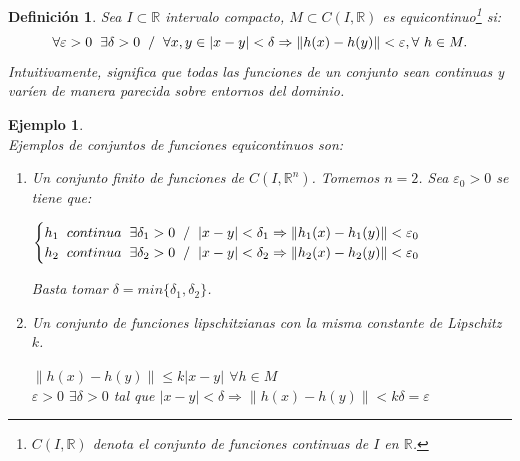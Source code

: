 \documentclass[11pt, a4paper,twoside]{article}
\newcommand{\iindex}[1]{\emph{#1}\index{#1}}
\theoremstyle{theorem-style}  %
\theoremstyle{definition-style}
\newtheorem{definition}{Definición}[section]
\theoremstyle{example-style}
\newtheorem{example}{Ejemplo}[section]
\providecommand{\norm}[1]{\left\lVert#1\right\rVert} %
\begin{document}
\begin{definition}
	Sea $I \subset \mathbb{R}$ intervalo compacto, $M \subset C(I, \mathbb{R})$ es \iindex{equicontinuo}\footnote{ $ C(I, \mathbb{R})$ denota el conjunto de funciones continuas de $ I $ en $ \mathbb{R} $.} si:
	\[\forall \varepsilon > 0 \hspace{0,2cm} \exists \delta > 0 \hspace{0,2cm} / \hspace{0,2cm} \forall x, y\in |x-y| < \delta \Rightarrow \norm{h(x) - h(y)} < \varepsilon, \forall \ h \in M.\]
	Intuitivamente, significa que todas las funciones de un conjunto sean continuas y varíen de manera parecida sobre entornos del dominio.
\end{definition}
\begin{example} \ \\
	Ejemplos de conjuntos de funciones equicontinuos son:
	\begin{enumerate}
		\item Un conjunto finito de funciones de $C(I, \mathbb{R}^n)$. Tomemos $n = 2$. Sea $\varepsilon_0 > 0$ se tiene que:
		\begin{center}
			$\begin{cases}
			h_1 \hspace{0,2cm} continua \hspace{0,2cm} \exists \delta_1 > 0 \hspace{0,2cm} / \hspace{0,2cm} |x-y|<\delta_1 \Rightarrow \norm{h_1(x) - h_1(y)} < \varepsilon_0 \\
			h_2 \hspace{0,2cm} continua \hspace{0,2cm} \exists \delta_2 > 0 \hspace{0,2cm} / \hspace{0,2cm} |x-y|<\delta_2 \Rightarrow \norm{h_2(x) - h_2(y)} < \varepsilon_0
			\end{cases}$
		\end{center}
		Basta tomar $\delta = min\{\delta_1, \delta_2\}$.
		\item Un conjunto de funciones lipschitzianas con la misma constante de Lipschitz $k$.
		\begin{center}
			$\norm{h(x) - h(y)}\leq k|x-y|$ $\forall h \in M$ \\
			$\varepsilon > 0$ $\exists \delta > 0$ tal que $|x-y|<\delta \Rightarrow \norm{h(x) - h(y)} < k\delta = \varepsilon$
		\end{center}
	\end{enumerate}
\end{example}
\end{document}
